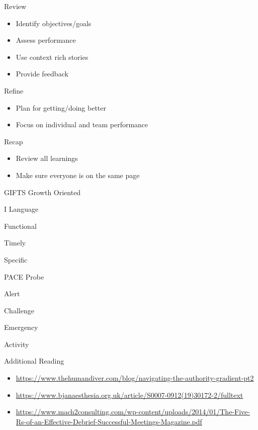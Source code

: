 \documentclass[aspectratio=169]{beamer}
\begin{document}
\begin{frame}{Review}
    \begin{itemize}
        \item Identify objectives/goals
        \item Assess performance
        \item Use context rich stories
        \item Provide feedback
    \end{itemize}
\end{frame}
\begin{frame}{Refine}
    \begin{itemize}
        \item Plan for getting/doing better
        \item Focus on individual and team performance
    \end{itemize}
\end{frame}
\begin{frame}{Recap}
    \begin{itemize}
        \item Review all learnings
        \item Make sure everyone is on the same page
    \end{itemize}
\end{frame}
\begin{frame}{GIFTS}
    Growth Oriented

    I Language

    Functional

    Timely

    Specific
\end{frame}
\begin{frame}{PACE}
    Probe

    Alert

    Challenge

    Emergency
\end{frame}
\begin{frame}
    Activity
\end{frame}
\begin{frame}{Additional Reading}
    \begin{itemize}
        \item \url{https://www.thehumandiver.com/blog/navigating-the-authority-gradient-pt2}
        \item \url{https://www.bjanaesthesia.org.uk/article/S0007-0912(19)30172-2/fulltext}
        \item \url{https://www.mach2consulting.com/wp-content/uploads/2014/01/The-Five-Rs-of-an-Effective-Debrief-Successful-Meetings-Magazine.pdf}
    \end{itemize}
\end{frame}
\end{document}
